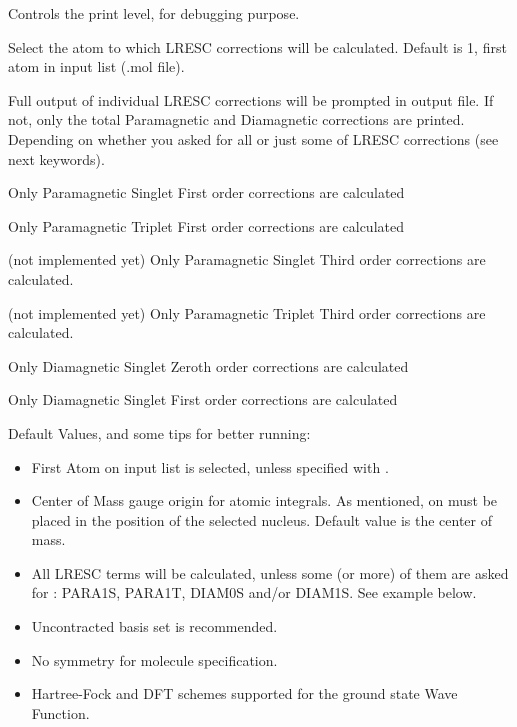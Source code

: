 \begin{list}{}{\itemsep 0.10cm \parsep 0.0cm}
\item[\Key{PRINT}] Controls the print level, for debugging purpose.
\item[\Key{SELECT}] Select the atom to which LRESC corrections will be calculated. Default is 1, first atom in input list (.mol file).
\item[\Key{PRTALL}] Full output of individual LRESC corrections will be prompted in output file. If not, only the total Paramagnetic and Diamagnetic corrections are printed. Depending on whether you asked for all or just some of LRESC corrections (see next keywords).
\item[\Key{PARA1S}] Only Paramagnetic Singlet First order corrections are calculated 
\item[\Key{PARA1T}] Only Paramagnetic Triplet First order corrections are calculated 
\item[\Key{PARA3S}] (not implemented yet) Only Paramagnetic Singlet Third order corrections are calculated. 
\item[\Key{PARA3T}] (not implemented yet) Only Paramagnetic Triplet Third order corrections are calculated. 
\item[\Key{DIAM0S}] Only Diamagnetic Singlet Zeroth order corrections are calculated 
\item[\Key{DIAM1S}] Only Diamagnetic Singlet First order corrections are calculated 
\end{list}


Default Values, and some tips for better running:

\begin{center}
\begin{itemize}{}{}
\item First Atom on input list is selected, unless specified with . 
\item Center of Mass gauge origin for atomic integrals. As mentioned,  on 
 must be placed in the position of the selected nucleus. Default value is the center of mass.
\item All LRESC terms will be calculated, unless some (or more) of them are asked for : PARA1S, PARA1T, DIAM0S and/or DIAM1S. See example below.
\item Uncontracted basis set is recommended. 
\item No symmetry for molecule specification. 
\item Hartree-Fock and DFT schemes supported for the ground state Wave Function.
\end{itemize}
\end{center}


